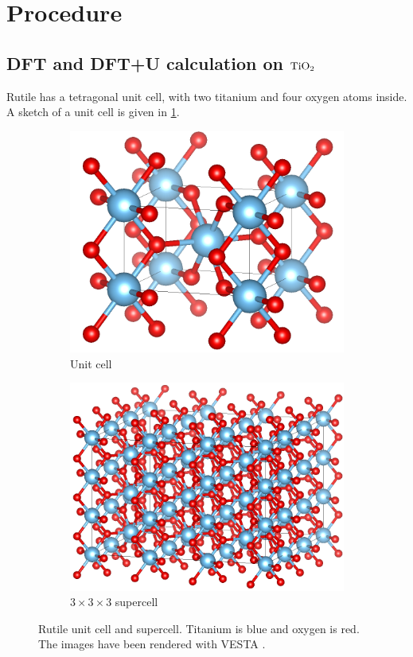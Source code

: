\section{Procedure}
\subsection{DFT and DFT+U calculation on $\ce{TiO_2}$}
Rutile has a tetragonal unit cell, with two titanium and four oxygen atoms inside. A sketch of a unit cell is given in \cref{fig:rutile}.
\begin{figure}
    \centering
    \begin{subfigure}[t]{0.48\textwidth}
        \centering
        \includegraphics[width=1\textwidth]{figures/rutile.png}
        \caption{Unit cell}
        \label{fig:rutile}
    \end{subfigure}
    \hfill
    \begin{subfigure}[t]{0.48\textwidth}
        \centering
        \includegraphics[width=1\textwidth]{figures/supercell.png}
        \caption{$3\times3\times3$ supercell}
        \label{fig:supercell}
    \end{subfigure}
    \caption{Rutile unit cell and supercell. Titanium is blue and oxygen is red. The images have been rendered with VESTA \cite{zotero-174}.}
\end{figure}

